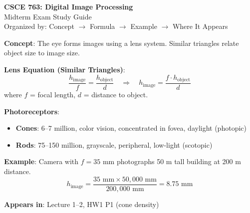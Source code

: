 \documentclass[10pt]{article}
\begin{document}
\begin{center}
{\LARGE\bfseries CSCE 763: Digital Image Processing}\\[0.3em]
{\Large Midterm Exam Study Guide}\\[0.2em]
{\small Organized by: Concept $\to$ Formula $\to$ Example $\to$ Where It Appears}
\end{center}

\vspace{0.3cm}


\begin{conceptbox}

\textbf{Concept}: The eye forms images using a lens system. Similar triangles relate object size to image size.

\begin{formulabox}
\textbf{Lens Equation (Similar Triangles)}:
\[
\frac{h_{\text{image}}}{f} = \frac{h_{\text{object}}}{d} \quad \Rightarrow \quad h_{\text{image}} = \frac{f \cdot h_{\text{object}}}{d}
\]
where $f$ = focal length, $d$ = distance to object.

\textbf{Photoreceptors}:
\begin{itemize}[leftmargin=1.5em, itemsep=0pt, topsep=2pt]
    \item \textbf{Cones}: 6--7 million, color vision, concentrated in fovea, daylight (photopic)
    \item \textbf{Rods}: 75--150 million, grayscale, peripheral, low-light (scotopic)
\end{itemize}
\end{formulabox}

\begin{examplebox}
\textbf{Example}: Camera with $f = 35$ mm photographs 50 m tall building at 200 m distance.
\[
h_{\text{image}} = \frac{35 \text{ mm} \times 50{,}000 \text{ mm}}{200{,}000 \text{ mm}} = 8.75 \text{ mm}
\]
\end{examplebox}

\textbf{Appears in}: Lecture 1--2, HW1 P1 (cone density)

\end{conceptbox}

\end{document}
